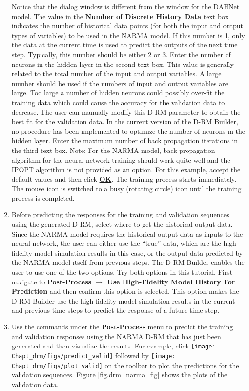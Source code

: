 \begin{enumerate}
	Notice that the dialog window is different from the window for the DABNet model.  The value in the \textbf{\underline{Number of Discrete History Data}} text box indicates the number of historical data points (for both the input and output types of variables) to be used in the NARMA model.  If this number is 1, only the data at the current time is used to predict the outputs of the next time step.  Typically, this number should be either 2 or 3.  Enter the number of neurons in the hidden layer in the second text box.  This value is generally related to the total number of the input and output variables.  A large number should be used if the numbers of input and output variables are large.  Too large a number of hidden neurons could possibly over-fit the training data which could cause the accuracy for the validation data to decrease.  The user can manually modify this D-RM parameter to obtain the best fit for the validation data.  In the current version of the D-RM Builder, no procedure has been implemented to optimize the number of neurons in the hidden layer.  Enter the maximum number of back propagation iterations in the third text box.  Note: For the NARMA model, back propagation algorithm for the neural network training should work quite well and the IPOPT algorithm is not provided as an option.  For this example, accept the default values and then click \textbf{\underline{OK}}.  The training process starts immediately.  The mouse icon is switched to a busy (rotating circle) icon until the training process is completed.
	\item Before predicting the responses for the training and validation sequences using the generated D-RM, select where to get the historical output data.  Since the NARMA model requires the historical output data as inputs to the neural network, the user can either use the “true” data, which are the high-fidelity model simulation results in this case, or the output data predicted by the NARMA model itself from previous steps.  The D-RM Builder enables the user to use one of the two options.  Try both options in this tutorial.  First navigate to \textbf{Post-Process $\rightarrow$ Use High-Fidelity Model History For Prediction} and then confirm this option is selected.  This option makes the D-RM Builder use the high-fidelity model simulation results in the current and previous time steps to predict the response of a future time step.
	\item Use the commands under the \textbf{\underline{Post-Process}} menu to predict the training and validation responses using the NARMA D-RM that has just been generated and then visualize the results.  For example, click \texttt{[image: Chapt\_drm/figs/predict\_valid]} followed by \texttt{[image: Chapt\_drm/figs/plot\_valid]} on the toolbar to plot the predictions for the validation sequences.  Figure \ref{fig.drm_narma_fig} shows the plots of the validation data.

\end{enumerate}
